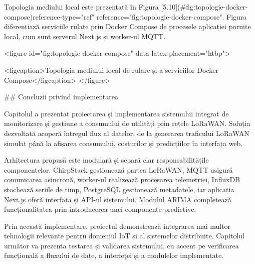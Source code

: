 Topologia mediului local este prezentată în Figura
[5.10](#fig:topologie-docker-compose){reference-type="ref"
reference="fig:topologie-docker-compose"}. Figura diferențiază
serviciile rulate prin Docker Compose de procesele aplicației pornite
local, cum sunt serverul Next.js și worker-ul MQTT.

<figure id="fig:topologie-docker-compose" data-latex-placement="htbp">

<figcaption>Topologia mediului local de rulare și a serviciilor Docker
Compose</figcaption>
</figure>

## Concluzii privind implementarea

Capitolul a prezentat proiectarea și implementarea sistemului integrat
de monitorizare și gestiune a consumului de utilități prin rețele
LoRaWAN. Soluția dezvoltată acoperă întregul flux al datelor, de la
generarea traficului LoRaWAN simulat până la afișarea consumului,
costurilor și predicțiilor în interfața web.

Arhitectura propusă este modulară și separă clar responsabilitățile
componentelor. ChirpStack gestionează partea LoRaWAN, MQTT asigură
comunicarea asincronă, worker-ul realizează procesarea telemetriei,
InfluxDB stochează seriile de timp, PostgreSQL gestionează metadatele,
iar aplicația Next.js oferă interfața și API-ul sistemului. Modulul
ARIMA completează funcționalitatea prin introducerea unei componente
predictive.

Prin această implementare, proiectul demonstrează integrarea mai multor
tehnologii relevante pentru domeniul IoT și al sistemelor distribuite.
Capitolul următor va prezenta testarea și validarea sistemului, cu
accent pe verificarea funcțională a fluxului de date, a interfeței și a
modulelor implementate.
